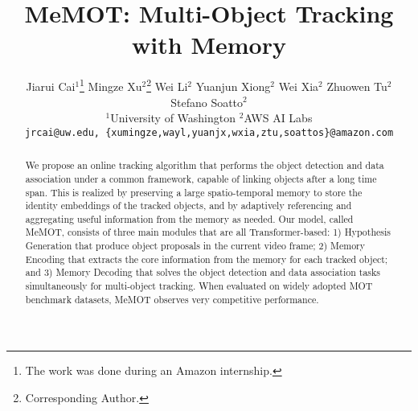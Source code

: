 \documentclass[10pt,twocolumn,letterpaper]{article}
\begin{document}
\title{MeMOT: Multi-Object Tracking with Memory}

\author{
    Jiarui Cai$^1$\thanks{The work was done during an Amazon internship.} \hspace{0.35cm} Mingze Xu$^2$\thanks{Corresponding Author.} \hspace{0.25cm} Wei Li$^2$ \hspace{0.25cm} Yuanjun Xiong$^2$ \hspace{0.25cm} Wei Xia$^2$ \hspace{0.25cm} Zhuowen Tu$^2$ \hspace{0.25cm} Stefano Soatto$^2$ \\ [.5ex] $^1$University of Washington \hspace{0.9cm} $^2$AWS AI Labs \\ [.5ex]
    {\tt\small jrcai@uw.edu, \{xumingze,wayl,yuanjx,wxia,ztu,soattos\}@amazon.com}
}

\maketitle

\begin{abstract}
    We propose an online tracking algorithm that performs the object detection and data association under a common framework, capable of linking objects after a long time span. This is realized by preserving a large spatio-temporal memory to store the identity embeddings of the tracked objects, and by adaptively referencing and aggregating useful information from the memory as needed. Our model, called MeMOT, consists of three main modules that are all Transformer-based: 1) Hypothesis Generation that produce object proposals in the current video frame; 2) Memory Encoding that extracts the core information from the memory for each tracked object; and 3) Memory Decoding that solves the object detection and data association tasks simultaneously for multi-object tracking. When evaluated on widely adopted MOT benchmark datasets, MeMOT observes very competitive performance.
\end{abstract}









{\small


}
\end{document}
